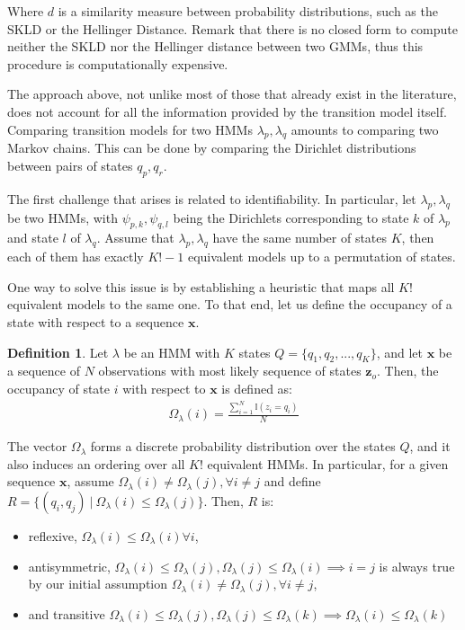 \documentclass[pdftex,11pt,a4paper]{article}
\theoremstyle{definition}
\newtheorem{definition}{Definition}[section]
\theoremstyle{remark}
\newcommand*{\V}[1]{\mathbf{#1}}%
\newcommand\given[1][]{\:#1\vert\:}
\begin{document}
Where $d$ is a similarity measure between probability distributions, such as the SKLD or the Hellinger Distance. Remark that there is no closed form to compute neither the SKLD nor the Hellinger distance between two GMMs, thus this procedure is computationally expensive.
\par The approach above, not unlike most of those that already exist in the literature, does not account for all the information provided by the transition model itself. Comparing transition models for two HMMs $\lambda_p, \lambda_q$ amounts to comparing two Markov chains. This can be done by comparing the Dirichlet distributions between pairs of states $q_p, q_r$. 
\par The first challenge that arises is related to identifiability. In particular, let $\lambda_p, \lambda_q$ be two HMMs, with $\psi_{p, k}, \psi_{q, l}$ being the Dirichlets corresponding to state $k$ of $\lambda_p$ and state $l$ of $\lambda_q$. Assume that $\lambda_p, \lambda_q$ have the same number of states $K$, then each of them has exactly $K!-1$ equivalent models up to a permutation of states. 
\par One way to solve this issue is by establishing a heuristic that maps all $K!$ equivalent models to the same one. To that end, let us define the occupancy of a state with respect to a sequence $\V{x}$. 
\begin{definition}\label{def_occupancy}
Let $\lambda$ be an HMM with $K$ states $Q = \{q_1, q_2, ..., q_K\}$, and let $\V{x}$ be a sequence of $N$ observations with most likely sequence of states $\V{z}_o$. Then, the occupancy of state $i$ with respect to $\V{x}$ is defined as:
\begin{align*}
\Omega_\lambda(i) = \frac{\sum_{i=1}^N\mathbb{I}(z_{i} = q_i)}{N}
\end{align*}
\end{definition}
\par The vector $\Omega_\lambda$ forms a discrete probability distribution over the states $Q$, and it also induces an ordering over all $K!$ equivalent HMMs. In particular, for a given sequence $\V{x}$, assume $\Omega_\lambda(i) \neq \Omega_\lambda(j), \forall i\neq j$ and define $R = \{(q_i, q_j) \given \Omega_\lambda(i) \leq \Omega_\lambda(j)\}$. Then, $R$ is:
\begin{itemize}
\item reflexive, $\Omega_\lambda(i) \leq \Omega_\lambda(i) \forall i$,
\item antisymmetric, $\Omega_\lambda(i) \leq \Omega_\lambda(j), \Omega_\lambda(j) \leq \Omega_\lambda(i) \implies i = j$ is always true by our initial assumption $\Omega_\lambda(i) \neq \Omega_\lambda(j), \forall i\neq j$,
\item and transitive $\Omega_\lambda(i) \leq \Omega_\lambda(j), \Omega_\lambda(j) \leq \Omega_\lambda(k) \implies \Omega_\lambda(i) \leq \Omega_\lambda(k)$
\end{itemize}
\end{document}
